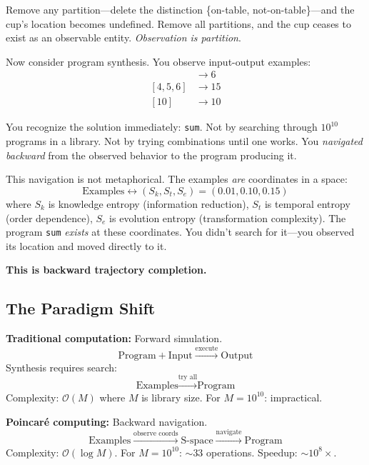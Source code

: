 \documentclass[twocolumn,10pt]{article}
\theoremstyle{definition}
\theoremstyle{remark}
\newcommand{\Sk}{S_k}
\newcommand{\St}{S_t}
\newcommand{\Se}{S_e}
\newcommand{\bigO}{\mathcal{O}}
\begin{document}
Remove any partition—delete the distinction \{on-table, not-on-table\}—and the cup's location becomes undefined. Remove all partitions, and the cup ceases to exist as an observable entity. \textit{Observation is partition}.

\vspace{0.2cm}
\noindent Now consider program synthesis. You observe input-output examples:
\begin{align}
[1, 2, 3] &\to 6 \\
[4, 5, 6] &\to 15 \\
[10] &\to 10
\end{align}

You recognize the solution immediately: \texttt{sum}. Not by searching through $10^{10}$ programs in a library. Not by trying combinations until one works. You \textit{navigated backward} from the observed behavior to the program producing it.

\vspace{0.2cm}
\noindent This navigation is not metaphorical. The examples \textit{are} coordinates in a space:
\begin{equation}
\text{Examples} \leftrightarrow (\Sk, \St, \Se) = (0.01, 0.10, 0.15)
\end{equation}
where $\Sk$ is knowledge entropy (information reduction), $\St$ is temporal entropy (order dependence), $\Se$ is evolution entropy (transformation complexity). The program \texttt{sum} \textit{exists} at these coordinates. You didn't search for it—you observed its location and moved directly to it.

\vspace{0.2cm}
\noindent\textbf{This is backward trajectory completion.}

\subsection{The Paradigm Shift}

\noindent\textbf{Traditional computation:} Forward simulation.
\begin{equation}
\text{Program} + \text{Input} \xrightarrow{\text{execute}} \text{Output}
\end{equation}
Synthesis requires search:
\begin{equation}
\text{Examples} \xrightarrow{\text{try all}} \text{Program}
\end{equation}
Complexity: $\bigO(M)$ where $M$ is library size. For $M = 10^{10}$: impractical.

\vspace{0.2cm}
\noindent\textbf{Poincaré computing:} Backward navigation.
\begin{equation}
\text{Examples} \xrightarrow{\text{observe coords}} \text{S-space} \xrightarrow{\text{navigate}} \text{Program}
\end{equation}
Complexity: $\bigO(\log M)$. For $M = 10^{10}$: $\sim 33$ operations. Speedup: $\sim 10^8\times$.
\end{document}
